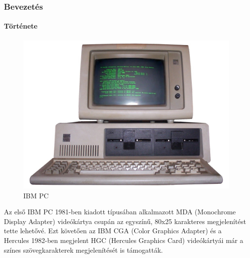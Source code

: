 \documentclass[tikz,border=10pt]{beamer}
\begin{document}
\begin{frame}
\frametitle{Bevezetés}
\framesubtitle{Története}
\transwipe[direction=90]
\begin{figure}
    \centering
    \includegraphics[scale=.09]{Media/ibmpc.jpg}
    \caption{IBM PC}
\end{figure}

Az első IBM PC 1981-ben kiadott típusában alkalmazott MDA (Monochrome Display Adapter) videókártya csupán az egyszínű, 80x25 karakteres megjelenítést tette lehetővé. Ezt követően az IBM CGA (Color Graphics Adapter) és a Hercules 1982-ben megjelent HGC (Hercules Graphics Card) videókártyái már a színes szövegkarakterek megjelenítését is támogatták.

\end{frame}
\end{document}
